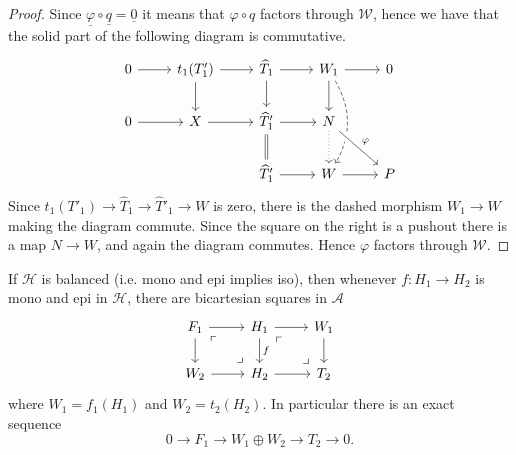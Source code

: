 \begin{proof}
  Since $\underline{\varphi}\circ\underline{q}=\underline{0}$ it means that $\varphi\circ q$ factors through $\mathcal{W}$, hence we
  have that the solid part of the following diagram is commutative.
  \begin{equation*}
    \begin{tikzcd}
      0\arrow{r}
        & t_1(T'_1)\arrow{r}\arrow{d}
          & \widehat{T}_1\arrow{r}\arrow{d}
            & W_1\arrow{r}\arrow{d}\arrow[bend left, dashed]{dd}
              & 0\\
      0\arrow{r}
        & X\arrow{r}
          & \widehat{T}'_1\arrow{r}\arrow[equal]{d}
            & N\arrow[crossing over]{dr}{\varphi}\arrow[dotted]{d}
              &\\
        & & \widehat{T}'_1\arrow{r}
            & W\arrow{r}
              & P
    \end{tikzcd}
  \end{equation*}
  Since $t_1(T'_1)\to \widehat{T}_1\to \widehat{T}'_1\to W$ is zero, there is the dashed morphism $W_1\to W$ making the
  diagram commute. Since the square on the right is a pushout there is a map $N\to W$, and again the diagram commutes.
  Hence $\varphi$ factors through $\mathcal{W}$.
\end{proof}

\clearpage

\addtocounter{thm}{5}

\begin{lemma}
  If $\mathcal{H}$ is balanced (i.e. mono and epi implies iso), then whenever $f:H_1\to H_2$
  is mono and epi in $\mathcal{H}$, there are bicartesian squares in $\mathcal{A}$
  \begin{equation*}
    \begin{tikzcd}
      F_1\arrow{r}\arrow{d}\arrow[phantom,"\ulcorner",very near start]{dr}
        \arrow[phantom,"\lrcorner",very near end]{dr}
        & H_1\arrow{r}\arrow{d}{f}\arrow[phantom,"\ulcorner",very near start]{dr}
          \arrow[phantom,"\lrcorner",very near end]{dr}
          & W_1\arrow{d}\\
      W_2\arrow{r}
        & H_2\arrow{r}
          & T_2
    \end{tikzcd}
  \end{equation*}
  where $W_1=f_1(H_1)$ and $W_2=t_2(H_2)$. In particular there is an exact sequence
  \begin{equation*}
    0\to F_1\to W_1\oplus W_2 \to T_2\to 0.
  \end{equation*}
\end{lemma}

